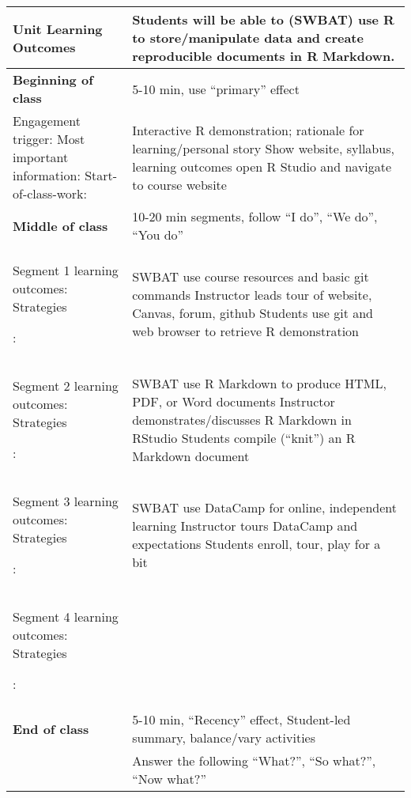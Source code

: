 \documentclass[letterpaper,11pt]{article}
\newcommand\Bshort{\rule[-5ex]{0pt}{0pt}} %
\newcommand\B{\rule[-10ex]{0pt}{0pt}} %
\begin{document}
\begin{tabular}{|p{0.3\linewidth} | p{0.7\linewidth}|}
  \hline
  \textbf{Unit Learning Outcomes} & Students will be able to (SWBAT) use R to store/manipulate data and create reproducible documents in R Markdown. \\
  \hline
  \textbf{Beginning of class} & 5-10 min, use ``primary'' effect
  \\
  \hline
  Engagement trigger: 
  \newline Most important information: 
  \newline Start-of-class-work:
                                  & Interactive R demonstration; rationale for learning/personal story
                                    \newline Show website, syllabus, learning outcomes
                                    \newline open R Studio and navigate to course website
  \\
  \hline
  \textbf{Middle of class} & 10-20 min segments, follow ``I do'', ``We do'', ``You do''
  \\
  \hline
  Segment 1 learning outcomes: 
  \newline Strategies \B:

                                  & SWBAT use course resources and basic git commands
                                    \newline Instructor leads tour of website, Canvas, forum, github
                                    \newline Students use git and web browser to retrieve R demonstration
  \\
  Segment 2 learning outcomes: 
  \newline Strategies \B:
                                  & SWBAT use R Markdown to produce HTML, PDF, or Word documents
                                    \newline Instructor demonstrates/discusses R Markdown in RStudio
                                    \newline Students compile (``knit'') an R Markdown document
  \\
  Segment 3 learning outcomes: 
  \newline Strategies \B:
                                  & SWBAT use DataCamp for online, independent learning
                                    \newline Instructor tours DataCamp and expectations
                                    \newline Students enroll, tour, play for a bit
  \\
  Segment 4 learning outcomes:
  \newline Strategies \B:
                                  &
  \\
  \hline
  \textbf{End of class} & 5-10 min, ``Recency'' effect, Student-led summary, balance/vary activities \\
  \hline
  \Bshort
                                  & Answer the following ``What?'', ``So what?'', ``Now what?''
  \\
  \hline
\end{tabular}
\end{document}
